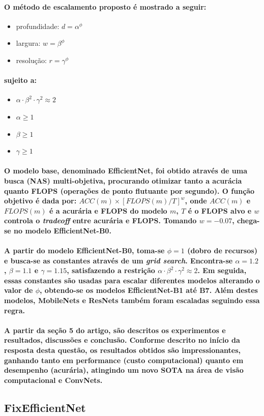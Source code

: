 \documentclass[a4paper]{article}    %
\begin{document}
\paragraph{O método de escalamento proposto é mostrado a seguir:}
\begin{itemize}
    \item profundidade: $d = \alpha^\phi$
    \item largura: $w = \beta^\phi$
    \item resolução: $r = \gamma^\phi$
\end{itemize}
\paragraph{sujeito a:}
\begin{itemize}
    \item $\alpha \cdot \beta^2 \cdot \gamma^2 \approx 2$
    \item $\alpha \geq 1$
    \item $\beta \geq 1$
    \item $\gamma \geq 1$
\end{itemize}

\paragraph{O modelo base, denominado EfficientNet, foi obtido através de uma busca (NAS) multi-objetiva, procurando otimizar tanto a acurácia quanto FLOPS (operações de ponto flutuante por segundo). O função objetivo é dada por: $ACC(m) \times [FLOPS(m)/T]^w$, onde $ACC(m)$ e $FLOPS(m)$ é a acurária e FLOPS do modelo $m$, $T$ é o FLOPS alvo e $w$ controla o \emph{tradeoff} entre acurária e FLOPS. Tomando $w = -0.07$, chega-se no modelo EfficientNet-B0.}

\paragraph{A partir do modelo EfficientNet-B0, toma-se $\phi=1$ (dobro de recursos) e busca-se as constantes através de um \emph{grid search}. Encontra-se $\alpha=1.2$, $\beta=1.1$ e $\gamma=1.15$, satisfazendo a restrição $\alpha \cdot \beta^2 \cdot \gamma^2 \approx 2$. Em seguida, essas constantes são usadas para escalar diferentes modelos alterando o valor de $\phi$, obtendo-se os modelos EfficientNet-B1 até B7. Além destes modelos, MobileNets e ResNets também foram escaladas seguindo essa regra.}

\paragraph{A partir da seção 5 do artigo, são descritos os experimentos e resultados, discussões e conclusão. Conforme descrito no início da resposta desta questão, os resultados obtidos são impressionantes, ganhando tanto em performance (custo computacional) quanto em desempenho (acurária), atingindo um novo SOTA na área de visão computacional e ConvNets.}

\subsection{FixEfficientNet}



\end{document}
